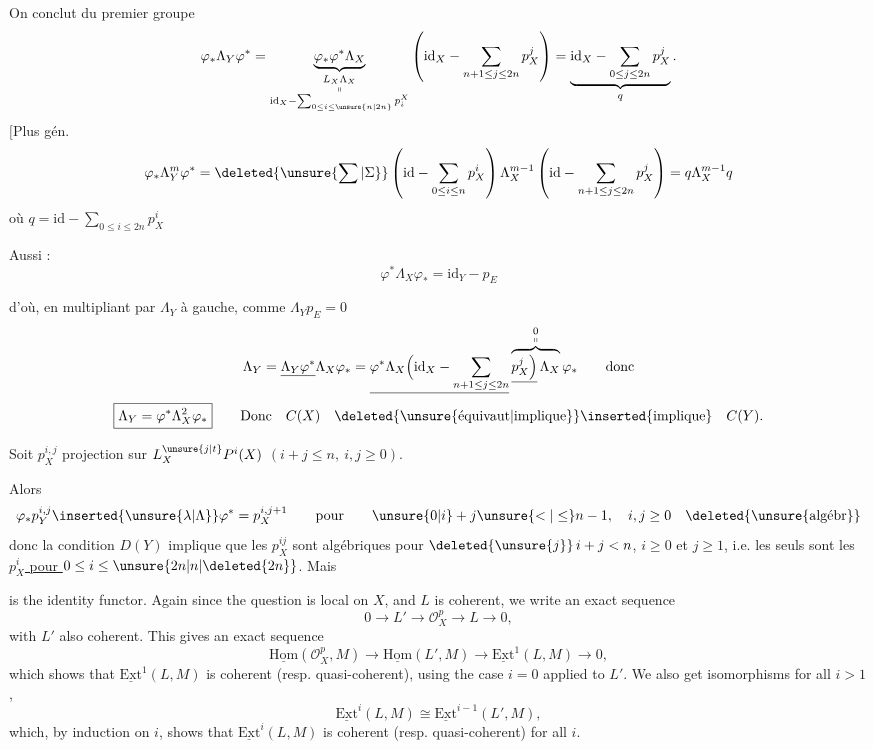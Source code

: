 On conclut du premier groupe
\[
\varphi_*\Lambda_Y\varphi^*
 =\underbrace{\varphi_*\varphi^*\Lambda_X}_{\substack{L_X\Lambda_X\\ \shortparallel\\ \mathrm{id}_X-\sum_{0\leq i\leq\unsure{n|2n}}p_i^X}}
 \left(\mathrm{id}_X-\sum_{n+1\leq j\leq2n}p_X^j\right)
 =\underbrace{\mathrm{id}_X-\sum_{0\leq j\leq2n}p_X^j}_{q}.
\]
$[$Plus gén.
\[
\varphi_*\Lambda_Y^m\varphi^*
=\deleted{\unsure{\sum|\Sigma}}\left(\mathrm{id}-\sum_{0\leq i\leq n}p_X^i\right)\Lambda_X^{m-1}
 \left(\mathrm{id}-\sum_{n+1\leq j\leq2n}p_X^j\right)=q\Lambda_X^{m-1}q
\]
où $q=\mathrm{id}-\sum_{0\leq i\leq2n}p_X^i$

Aussi :
\[
\varphi^*\Lambda_X\varphi_*=\mathrm{id}_Y-p_E
\]

d'où, en multipliant par $\Lambda_Y$ à gauche, comme $\Lambda_Yp_E=0$
\[
\Lambda_Y=\underline{\Lambda_Y\varphi^*}\Lambda_X\varphi_*=
 \underline{\varphi^*\Lambda_X\Bigl(\mathrm{id}_X-\sum_{n+1\leq j\leq2n}}
 \overbrace{\underline{p_X^j\Bigr)}\,\Lambda_X}^{\substack{0\\\shortparallel}}\varphi_*\qquad\text{donc}
\]
\[
\boxed{\Lambda_Y=\varphi^*\Lambda_X^2\varphi_*}
\qquad\text{Donc}\quad C(X)\quad\text{\deleted{\unsure{équivaut|implique}}\inserted{implique}}\quad C(Y).
\]

Soit $p_X^{i,j}$  projection sur $L_X^{\unsure{j|t}}P^i(X)$ \quad $(i+j\leq n,\ i,j\geq0)$.

Alors
\[
\varphi_*p_Y^{i,j}\inserted{\unsure{\lambda|\Lambda}}\varphi^*=p_X^{i,j+1}
 \qquad\text{pour}\qquad \unsure{0|i}+j\unsure{<|\leq}n-1,\quad i,j\geq0\quad\deleted{\unsure{\text{algébr}}}
\]
donc la condition $D(Y)$ implique que les $p_X^{ij}$ sont algébriques pour $\deleted{\unsure{j}}\,i+j<n$, $i\geq0$ et \uline{$j\geq1$}, i.e. les seuls  sont les \uline{$p_X^i$ pour $0\leq i\leq\unsure{2n|n|\deleted{2n}}$}. Mais

is the identity functor. Again since the question is local on $X$, and $L$ is coherent, we write an exact sequence
\[
0\longrightarrow L'\longrightarrow\mathscr{O}_X^p\longrightarrow L\longrightarrow0,
\]
with $L'$ also coherent. This gives an exact sequence
\[
\underline{\mathrm{Hom}}(\mathscr{O}_X^p,M)\longrightarrow\underline{\mathrm{Hom}}(L',M)\longrightarrow\underline{\mathrm{Ext}}^1(L,M)\longrightarrow0,
\]
which shows that $\underline{\mathrm{Ext}}^1(L,M)$ is coherent (resp. quasi-coherent), using the case $i=0$ applied to $L'$. We also get isomorphisms for all $i>1$,
\[
\underline{\mathrm{Ext}}^i(L,M)\cong\underline{\mathrm{Ext}}^{i-1}(L',M),
\]
which, by induction on $i$, shows that $\underline{\mathrm{Ext}}^i(L,M)$ is coherent (resp. quasi-coherent) for all $i$.

